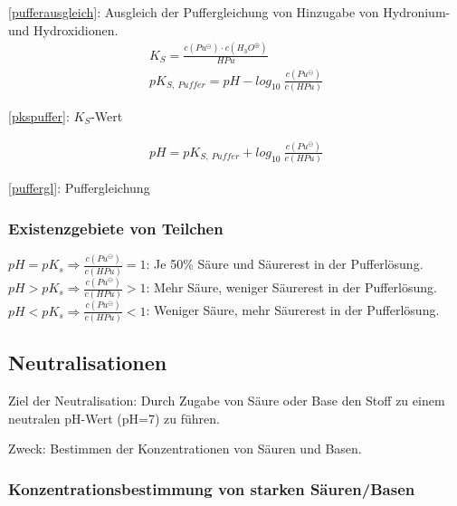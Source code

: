 \ref{pufferausgleich}: Ausgleich der Puffergleichung von Hinzugabe von Hydronium- und Hydroxidionen.\\

{\large
	\begin{equation}
	\begin{split}
		\label{pkspuffer}
		K_S = \frac{c(Pu^\ominus) \cdot c(H_3O^\oplus)}{HPu}\\
		pK_{S,\ Puffer} = pH - log_{10}\ \frac{c(Pu^\ominus)}{c(HPu)}
	\end{split}
	\end{equation}
}

\ref{pkspuffer}: $K_S$-Wert

{\large
	\begin{equation}
	\begin{split}
	\label{puffergl}
	pH= pK_{S,\ Puffer} + log_{10}\ \frac{c(Pu^\ominus)}{c(HPu)}
	\end{split}
	\end{equation}
}

\ref{puffergl}: Puffergleichung

\subsubsection{Existenzgebiete von Teilchen}

$pH = pK_s \Rightarrow \frac{c(Pu^\ominus)}{c(HPu)} = 1$: Je 50\% Säure und Säurerest in der Pufferlösung.\\

$pH > pK_s \Rightarrow \frac{c(Pu^\ominus)}{c(HPu)} > 1$: Mehr Säure, weniger Säurerest in der Pufferlösung.\\

$pH < pK_s \Rightarrow \frac{c(Pu^\ominus)}{c(HPu)} < 1$: Weniger Säure, mehr Säurerest in der Pufferlösung.

\subsection{Neutralisationen}

Ziel der Neutralisation: Durch Zugabe von Säure oder Base den Stoff zu einem neutralen pH-Wert (pH=7) zu führen.

Zweck: Bestimmen der Konzentrationen von Säuren und Basen.

\subsubsection{Konzentrationsbestimmung von starken Säuren/Basen}

